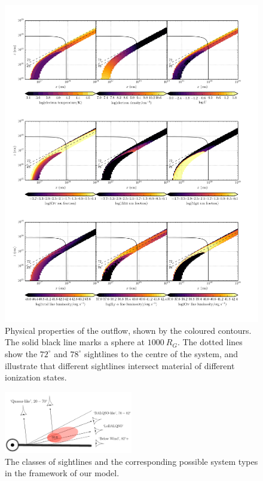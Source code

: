 \documentclass[preprint, a4paper, 11pt]{aastex}
\begin{document}
\begin{figure} %
\centering
\includegraphics[width=1.0\textwidth]{figures/wind.png}
\caption
{
Physical properties of the outflow, shown by the coloured contours.
The solid black line marks a sphere at $1000~R_G$.
The dotted lines show the $72^\circ$ and $78^\circ$ sightlines 
to the centre of the system, and illustrate that different sightlines
intersect material of different ionization states.
}
\label{fig:wind}
\end{figure} %

\begin{figure}
\centering
\includegraphics[width=0.5\textwidth]{figures/sightlines.png}
\caption
{
The classes of sightlines and the corresponding possible 
system types in the framework of our model.
}
\label{fig:sightline}
\end{figure}
\end{document}
